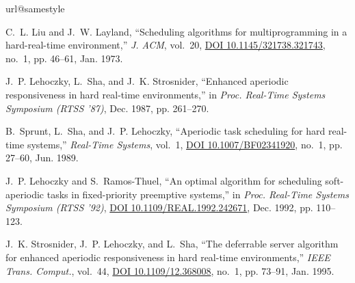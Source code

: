 \documentclass[12pt,onecolumn]{IEEEtranTIE}
\begin{document}
\begin{thebibliography}{10}
\providecommand{\url}[1]{#1}
\csname url@samestyle\endcsname
\providecommand{\newblock}{\relax}
\providecommand{\bibinfo}[2]{#2}
\providecommand{\BIBentrySTDinterwordspacing}{\spaceskip=0pt\relax}
\providecommand{\BIBentryALTinterwordstretchfactor}{4}
\providecommand{\BIBentryALTinterwordspacing}{\spaceskip=\fontdimen2\font plus
\BIBentryALTinterwordstretchfactor\fontdimen3\font minus
  \fontdimen4\font\relax}
\providecommand{\BIBforeignlanguage}[2]{{%
\expandafter\ifx\csname l@#1\endcsname\relax
\typeout{** WARNING: IEEEtran.bst: No hyphenation pattern has been}%
\typeout{** loaded for the language `#1'. Using the pattern for}%
\typeout{** the default language instead.}%
\else
\language=\csname l@#1\endcsname
\fi
#2}}
\providecommand{\BIBdecl}{\relax}
\BIBdecl

C.~L. Liu and J.~W. Layland, ``Scheduling algorithms for multiprogramming in a
  hard-real-time environment,'' \emph{J. {ACM}}, vol.~20,
  \href{http://dx.doi.org/10.1145/321738.321743}{DOI 10.1145/321738.321743},
  no.~1, pp. 46--61, Jan. 1973.

J.~P. Lehoczky, L.~Sha, and J.~K. Strosnider, ``Enhanced aperiodic
  responsiveness in hard real-time environments,'' in \emph{Proc. Real-Time
  Systems Symposium ({RTSS} '87)}, Dec. 1987, pp. 261--270.

B.~Sprunt, L.~Sha, and J.~P. Lehoczky, ``Aperiodic task scheduling for hard
  real-time systems,'' \emph{Real-Time Systems}, vol.~1,
  \href{http://dx.doi.org/10.1007/BF02341920}{DOI 10.1007/BF02341920}, no.~1,
  pp. 27--60, Jun. 1989.

J.~P. Lehoczky and S.~Ramos{-}Thuel, ``An optimal algorithm for scheduling
  soft-aperiodic tasks in fixed-priority preemptive systems,'' in \emph{Proc.
  Real-Time Systems Symposium ({RTSS} '92)},
  \href{http://dx.doi.org/10.1109/REAL.1992.242671}{DOI
  10.1109/REAL.1992.242671}, Dec. 1992, pp. 110--123.

J.~K. Strosnider, J.~P. Lehoczky, and L.~Sha, ``The deferrable server algorithm
  for enhanced aperiodic responsiveness in hard real-time environments,''
  \emph{{IEEE} Trans. Comput.}, vol.~44,
  \href{http://dx.doi.org/10.1109/12.368008}{DOI 10.1109/12.368008}, no.~1, pp.
  73--91, Jan. 1995.


\end{thebibliography}
\end{document}
